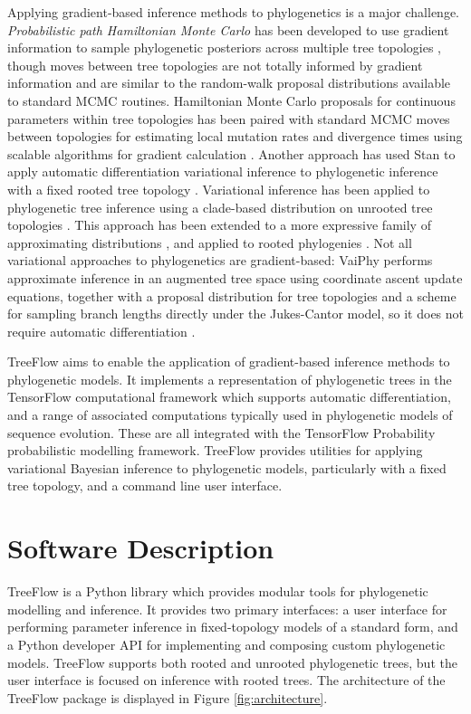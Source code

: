 \documentclass[oupdraft]{sysbio_sse}
\let\cite\citep
\begin{document}
Applying gradient-based inference methods to phylogenetics is a major challenge. \textit{Probabilistic path Hamiltonian Monte Carlo} has been developed to use gradient information to sample phylogenetic posteriors across multiple tree topologies \cite{dinh2017probabilistic}, though moves between tree topologies are not totally informed by gradient information and are similar to the random-walk proposal distributions available to standard MCMC routines. Hamiltonian Monte Carlo proposals for continuous parameters within tree topologies has been paired with standard MCMC moves between topologies for estimating local mutation rates and divergence times using scalable algorithms for gradient calculation \cite{fisher2023shrinkage, ji2023scalable}. Another approach has used Stan to apply automatic differentiation variational inference to phylogenetic inference with a fixed rooted tree topology \cite{fourment2019evaluating}. Variational inference has been applied to phylogenetic tree inference using a clade-based distribution on unrooted tree topologies \cite{zhang2018variational}. This approach has been extended to a more expressive family of approximating distributions \cite{zhang2020improved}, and applied to rooted phylogenies \cite{zhang2022variational}. Not all variational approaches to phylogenetics are gradient-based: VaiPhy performs approximate inference in an augmented tree space using coordinate ascent update equations, together with a proposal distribution for tree topologies and a scheme for sampling branch lengths directly under the Jukes-Cantor model, so it does not require automatic differentiation \cite{koptagel2022vaiphy}.

TreeFlow aims to enable the application of gradient-based inference methods to phylogenetic models. It implements a representation of phylogenetic trees in the TensorFlow computational framework which supports automatic differentiation, and a range of associated computations typically used in phylogenetic models of sequence evolution. These are all integrated with the TensorFlow Probability probabilistic modelling framework. TreeFlow provides utilities for applying variational Bayesian inference to phylogenetic models, particularly with a fixed tree topology, and a command line user interface.

\section{Software Description}

TreeFlow is a Python library which provides modular tools for phylogenetic modelling and inference. It provides two primary interfaces: a user interface for performing parameter inference in fixed-topology models of a standard form, and a Python developer API for implementing and composing custom phylogenetic models. TreeFlow supports both rooted and unrooted phylogenetic trees, but the user interface is focused on inference with rooted trees. The architecture of the TreeFlow package is displayed in Figure \ref{fig:architecture}.
\end{document}
